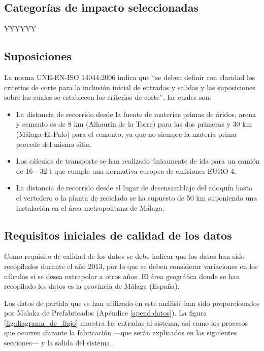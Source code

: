 \subsection{Categorías de impacto seleccionadas}

YYYYYY

\subsection{Suposiciones}
La norma UNE-EN-ISO 14044:2006 \cite{iso14044} indica que ``se deben definir con claridad los criterios de corte para la inclusión inicial de entradas y salidas y las suposiciones sobre las cuales se establecen los criterios de corte'', las cuales son:

\begin{itemize}
  \item La distancia de recorrido desde la fuente de materias primas de áridos, arena y cemento es de 8 \si{km} (Alhaurín de la Torre) para las dos primeras y 30 \si{km} (Málaga-El Palo) para el cemento, ya que no siempre la materia prima procede del mismo sitio.
  \item Los cálculos de transporte se han realizado únicamente de ida para un camión de 16—32 \si{\tonne} que cumple una normativa europea de emisiones EURO 4.
  \item La distancia de recorrido desde el lugar de desensamblaje del adoquín hasta el vertedero o la planta de reciclado se ha supuesto de 50 \si{km} suponiendo una instalación en el área metropolitana de Málaga.
\end{itemize}

\subsection{Requisitos iniciales de calidad de los datos}
Como requisito de calidad de los datos se debe indicar que los datos han sido recopilados durante el año 2013, por lo que se deben considerar variaciones en los cálculos si se desea extrapolar a otros años. El área geográfica donde se han recopilado los datos es la provincia de Málaga (España).

Los datos de partida que se han utilizado en este análisis han sido proporcionados por Malaka de Prefabricados (Apéndice \ref{apend:datos}). La figura \ref{fig:diagrama_de_flujo} muestra las entradas al sistema, así como los procesos que ocurren durante la fabricación —que serán explicados en las siguientes secciones— y la salida del sistema.
